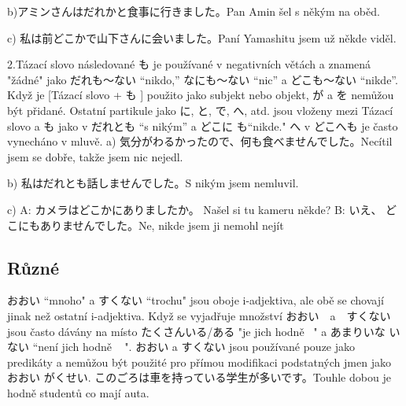 b)アミンさんはだれかと食事に行きました。Pan Amin šel s někým na oběd.


c) 私は前どこかで山下さんに会いました。Paní Yamashitu jsem už někde viděl.


2.Tázací slovo následované も je používané v negativních větách a znamená "žádné" jako だれも〜ない “nikdo,”  なにも〜ない “nic” a どこも〜ない “nikde”. Když je [Tázací slovo + も ] použito jako subjekt nebo objekt,  が a を nemůžou být přidané. Ostatní partikule jako  に, と, で, へ, atd. jsou vloženy mezi Tázací slovo a  も jako v だれとも “s nikým” a どこに も“nikde." へ v どこへも je často vynecháno v mluvě.
a) 気分がわるかったので、何も食べませんでした。Necítil jsem se dobře, takže jsem nic nejedl.

b) 私はだれとも話しませんでした。S nikým jsem nemluvil.

c)
 A: カメラはどこかにありましたか。 Našel si tu kameru někde?
B: いえ、 どこにもありませんでした。Ne, nikde jsem ji nemohl nejít

\subsection{Různé}


おおい “mnoho" a すくない “trochu" jsou oboje i-adjektiva, ale obě se chovají jinak než ostatní i-adjektiva. Když se vyjadřuje množství おおい　a　すくない jsou často dávány na místo  たくさんいる/ある "je jich hodně ~" a あまりいな いない “není jich hodně ~ ". おおい a すくない jsou používané pouze jako predikáty a nemůžou být použité pro přímou modifikaci podstatných jmen jako  おおい がくせい.
このごろは車を持っている学生が多いです。Touhle dobou je hodně studentů co mají auta.






